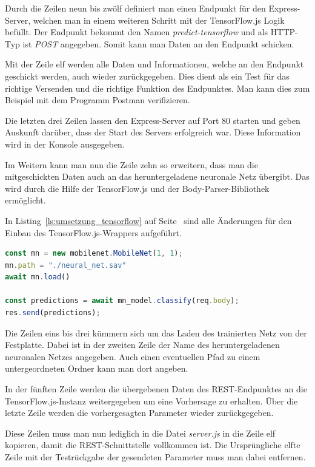 Durch die Zeilen neun bis zwölf definiert man einen Endpunkt für den Express-Server, welchen man in einem weiteren
Schritt mit der TensorFlow.js Logik befüllt. Der Endpunkt bekommt den Namen \textit{predict-tensorflow} und als HTTP-Typ
ist \textit{POST} angegeben. Somit kann man Daten an den Endpunkt schicken.

Mit der Zeile elf werden alle Daten und Informationen, welche an den Endpunkt geschickt werden, auch wieder
zurückgegeben. Dies dient als ein Test für das richtige Versenden und die richtige Funktion des Endpunktes. Man kann
dies zum Beispiel mit dem Programm Postman verifizieren.

Die letzten drei Zeilen lassen den Express-Server auf Port 80 starten und geben Auskunft darüber, dass der Start des
Servers erfolgreich war. Diese Information wird in der Konsole ausgegeben.

Im Weitern kann man nun die Zeile zehn so erweitern, dass man die mitgeschickten Daten auch an das heruntergeladene
neuronale Netz übergibt. Das wird durch die Hilfe der TensorFlow.js und der Body-Parser-Bibliothek ermöglicht.

In Listing~\ref{ls:umsetzung_tensorflow} auf Seite~\pageref{ls:umsetzung_tensorflow} sind alle Änderungen für den Einbau
des TensorFlow.js-Wrappers aufgeführt.

\begin{lstlisting}[language=JavaScript, caption=Der TensorFlow.js Programmteil, label=ls:umsetzung_tensorflow]
const mn = new mobilenet.MobileNet(1, 1);
mn.path = "./neural_net.sav"
await mn.load()

const predictions = await mn_model.classify(req.body);
res.send(predictions);
\end{lstlisting}

Die Zeilen eins bis drei kümmern sich um das Laden des trainierten Netz von der Festplatte. Dabei ist in der zweiten
Zeile der Name des heruntergeladenen neuronalen Netzes angegeben. Auch einen eventuellen Pfad zu einem untergeordneten
Ordner kann man dort angeben.

In der fünften Zeile werden die übergebenen Daten des REST-Endpunktes an die TensorFlow.js-Instanz weitergegeben um eine
Vorhersage zu erhalten. Über die letzte Zeile werden die vorhergesagten Parameter wieder zurückgegeben.

Diese Zeilen muss man nun lediglich in die Datei \textit{server.js} in die Zeile elf kopieren, damit die
REST-Schnittstelle vollkommen ist. Die Ursprüngliche elfte Zeile mit der Testrückgabe der gesendeten Parameter muss man
dabei entfernen.

